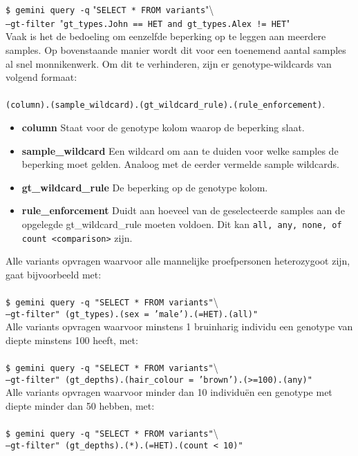\noindent\texttt{\$ gemini query -q} "\texttt{SELECT * FROM variants}"\textbackslash \\\texttt{--gt-filter }"\texttt{gt\_types.John == HET and gt\_types.Alex != HET}"\\

\noindent Vaak is het de bedoeling om eenzelfde beperking op te leggen aan meerdere samples. Op bovenstaande manier wordt dit voor een toenemend aantal samples al snel monnikenwerk. Om dit te verhinderen, zijn er genotype-wildcards van volgend formaat:\\\\
\texttt{(column).(sample\_wildcard).(gt\_wildcard\_rule).(rule\_enforcement)}.
\begin{itemize}
\item \textbf{column} Staat voor de genotype kolom waarop de beperking slaat.
\item \textbf{sample\_wildcard} Een wildcard om aan te duiden voor welke samples de beperking moet gelden. Analoog met de eerder vermelde sample wildcards.
\item \textbf{gt\_wildcard\_rule} De beperking op de genotype kolom.
\item \textbf{rule\_enforcement} Duidt aan hoeveel van de geselecteerde samples aan de opgelegde gt\_wildcard\_rule moeten voldoen. Dit kan \texttt{all, any, none, of count <comparison>} zijn.
\end{itemize}

\noindent Alle variants opvragen waarvoor alle mannelijke proefpersonen heterozygoot zijn, gaat bijvoorbeeld met:\\\\
\texttt{\$ gemini query -q "}\texttt{SELECT * FROM variants"}\textbackslash \\
\texttt{--gt-filter" }\texttt{(gt\_types).(sex = 'male').(=HET).(all)"}\\

\noindent Alle variants opvragen waarvoor minstens 1 bruinharig individu een genotype van diepte minstens 100 heeft, met:\\\\
\texttt{\$ gemini query -q "}\texttt{SELECT * FROM variants"}\textbackslash \\
\texttt{--gt-filter" }\texttt{(gt\_depths).(hair\_colour = 'brown').(>=100).(any)"}\\

\noindent Alle variants opvragen waarvoor minder dan 10 individu\"en een genotype met diepte minder dan 50 hebben, met:\\\\
\texttt{\$ gemini query -q "}\texttt{SELECT * FROM variants"}\textbackslash \\
\texttt{--gt-filter" }\texttt{(gt\_depths).(*).(=HET).(count < 10)"}\\

